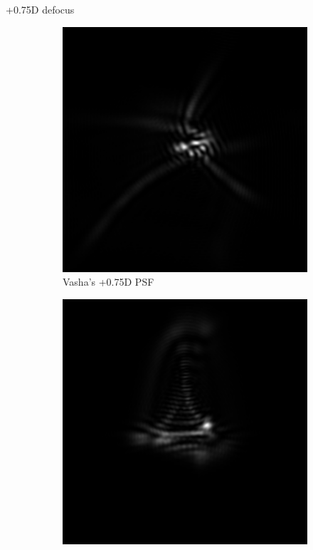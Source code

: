 \documentclass{article}
\begin{document}
+0.75D defocus
\begin{figure}[H]
\begin{subfigure}{.3\textwidth}
  \centering
  \includegraphics[width=1\linewidth]{Vasha_R_G_0530_2_500_zer_075_5_PSF.png}
  \caption{Vasha's +0.75D PSF}
  \label{fig:vasha075dpsf}
\end{subfigure}
\begin{subfigure}{.3\textwidth}
  \centering
  \includegraphics[width=1\linewidth]{Liz_R_G_0523_2_500_zer_075_5_PSF.png}

\end{subfigure}
\end{figure}
\end{document}
